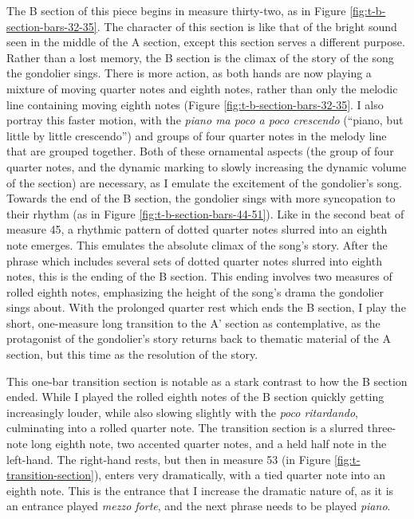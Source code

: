 The B section of this piece begins in measure thirty-two, as in Figure \ref{fig:t-b-section-bars-32-35}\autocite{Henle_2002}. The character of this section is like that of the bright sound seen in the middle of the A section, except this section serves a different purpose. Rather than a lost memory, the B section is the climax of the story of the song the gondolier sings. There is more action, as both hands are now playing a mixture of moving quarter notes and eighth notes, rather than only the melodic line containing moving eighth notes (Figure \ref{fig:t-b-section-bars-32-35}\autocite{Henle_2002}. I also portray this faster motion, with the \textit{piano ma poco a poco crescendo} (``piano, but little by little crescendo'') and groups of four quarter notes in the melody line that are grouped together. Both of these ornamental aspects (the group of four quarter notes, and the dynamic marking to slowly increasing the dynamic volume of the section) are necessary, as I emulate the excitement of the gondolier's song. Towards the end of the B section, the gondolier sings with more syncopation to their rhythm (as in Figure \ref{fig:t-b-section-bars-44-51}\autocite{Henle_2002}). Like in the second beat of measure 45, a rhythmic pattern of dotted quarter notes slurred into an eighth note emerges. This emulates the absolute climax of the song's story. After the phrase which includes several sets of dotted quarter notes slurred into eighth notes, this is the ending of the B section. This ending involves two measures of rolled eighth notes, emphasizing the height of the song's drama the gondolier sings about. With the prolonged quarter rest which ends the B section, I play the short, one-measure long transition to the A' section as contemplative, as the protagonist of the gondolier's story returns back to thematic material of the A section, but this time as the resolution of the story.

This one-bar transition section is notable as a stark contrast to how the B section ended. While I played the rolled eighth notes of the B section quickly getting increasingly louder, while also slowing slightly with the \textit{poco ritardando}, culminating into a rolled quarter note. The transition section is a slurred three-note long eighth note, two accented quarter notes, and a held half note in the left-hand. The right-hand rests, but then in measure 53 (in Figure \ref{fig:t-transition-section}\autocite{Henle_2002}), enters very dramatically, with a tied quarter note into an eighth note. This is the entrance that I increase the dramatic nature of, as it is an entrance played \textit{mezzo forte}, and the next phrase needs to be played \textit{piano}.

